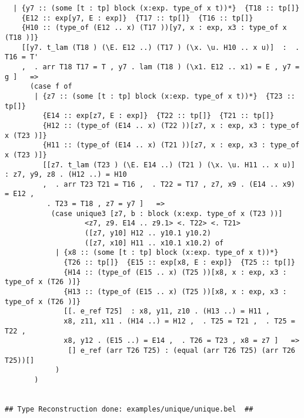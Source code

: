 \documentclass[12pt]{article}
\begin{document}
\begin{verbatim}
  | {y7 :: (some [t : tp] block (x:exp. type_of x t))*}  {T18 :: tp[]}
    {E12 :: exp[y7, E : exp]}  {T17 :: tp[]}  {T16 :: tp[]}
    {H10 :: (type_of (E12 .. x) (T17 ))[y7, x : exp, x3 : type_of x (T18 )]}
    [[y7. t_lam (T18 ) (\E. E12 ..) (T17 ) (\x. \u. H10 .. x u)]  :  . T16 = T'
    ,  . arr T18 T17 = T , y7 . lam (T18 ) (\x1. E12 .. x1) = E , y7 = g ]   =>
      (case f of
       | {z7 :: (some [t : tp] block (x:exp. type_of x t))*}  {T23 :: tp[]}
         {E14 :: exp[z7, E : exp]}  {T22 :: tp[]}  {T21 :: tp[]}
         {H12 :: (type_of (E14 .. x) (T22 ))[z7, x : exp, x3 : type_of x (T23 )]}
         {H11 :: (type_of (E14 .. x) (T21 ))[z7, x : exp, x3 : type_of x (T23 )]}
         [[z7. t_lam (T23 ) (\E. E14 ..) (T21 ) (\x. \u. H11 .. x u)]  : z7, y9, z8 . (H12 ..) = H10
         ,  . arr T23 T21 = T16 ,  . T22 = T17 , z7, x9 . (E14 .. x9) = E12 ,
          . T23 = T18 , z7 = y7 ]   =>
           (case unique3 [z7, b : block (x:exp. type_of x (T23 ))]
                   <z7, z9. E14 .. z9.1> <. T22> <. T21>
                   ([z7, y10] H12 .. y10.1 y10.2)
                   ([z7, x10] H11 .. x10.1 x10.2) of
            | {x8 :: (some [t : tp] block (x:exp. type_of x t))*}
              {T26 :: tp[]}  {E15 :: exp[x8, E : exp]}  {T25 :: tp[]}
              {H14 :: (type_of (E15 .. x) (T25 ))[x8, x : exp, x3 : type_of x (T26 )]}
              {H13 :: (type_of (E15 .. x) (T25 ))[x8, x : exp, x3 : type_of x (T26 )]}
              [[. e_ref T25]  : x8, y11, z10 . (H13 ..) = H11 ,
              x8, z11, x11 . (H14 ..) = H12 ,  . T25 = T21 ,  . T25 = T22 ,
              x8, y12 . (E15 ..) = E14 ,  . T26 = T23 , x8 = z7 ]   =>
               [] e_ref (arr T26 T25) : (equal (arr T26 T25) (arr T26 T25))[]
            )
       )


## Type Reconstruction done: examples/unique/unique.bel  ##


\end{verbatim}
\end{document}
